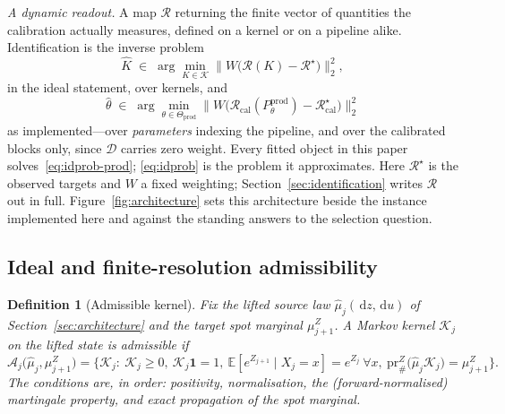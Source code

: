 \documentclass[11pt]{article}
\newtheorem{definition}{Definition}
\newcommand{\E}{\mathbb{E}}
\newcommand{\cK}{\mathcal{K}}
\newcommand{\cA}{\mathcal{A}}
\providecommand{\pr}{\mathrm{pr}}
\providecommand{\Kfam}{\mathcal{K}}
\providecommand{\Rcal}{\mathcal R}
\providecommand{\1}{\mathbf 1}
\newcommand{\dd}{\,\mathrm{d}}
\begin{document}
\emph{A dynamic readout.} A map $\Rcal$ returning the finite vector of quantities the calibration
actually measures, defined on a kernel or on a pipeline alike. Identification is the inverse
problem
\begin{equation}\label{eq:idprob}
  \widehat{K}\;\in\;\arg\min_{K\in\Kfam}
  \bigl\|W\bigl(\Rcal(K)-\Rcal^{\star}\bigr)\bigr\|_2^{2},
\end{equation}
in the ideal statement, over kernels, and
\begin{equation}\label{eq:idprob-prod}
  \widehat\theta\;\in\;\arg\min_{\theta\in\Theta_{\mathrm{prod}}}
  \bigl\|W\bigl(\Rcal_{\mathrm{cal}}(P^{\mathrm{prod}}_\theta)
      -\Rcal_{\mathrm{cal}}^{\star}\bigr)\bigr\|_2^{2}
\end{equation}
as implemented---over \emph{parameters} indexing the pipeline, and over the calibrated blocks only,
since $\mathcal D$ carries zero weight. Every fitted object in this paper
solves~\eqref{eq:idprob-prod}; \eqref{eq:idprob} is the problem it approximates. Here $\Rcal^{\star}$ is the observed targets and
$W$ a fixed weighting;
Section~\ref{sec:identification} writes $\Rcal$ out in full. Figure~\ref{fig:architecture}
sets this architecture beside the instance implemented here and against the standing
answers to the selection question.

\subsection{Ideal and finite-resolution admissibility}
\label{sec:admiss}
\begin{definition}[Admissible kernel]
Fix the lifted source law $\widehat\mu_j(\dd z,\dd u)$ of Section~\ref{sec:architecture} and the target spot marginal
$\mu^Z_{j+1}$. A Markov kernel $\cK_j$ on the lifted state is \emph{admissible} if
\begin{equation}
\cA_j\bigl(\widehat\mu_j,\mu^Z_{j+1}\bigr)=\Big\{\cK_j:\ \cK_j\ge 0,\ \cK_j\mathbf 1=1,\
\E[e^{Z_{j+1}}\mid X_j=x]=e^{Z_j}\ \forall x,\
\pr^Z_{\#}\bigl(\widehat\mu_j\cK_j\bigr)=\mu^Z_{j+1}\Big\}.
\label{eq:admissible}
\end{equation}
The conditions are, in order: positivity, normalisation, the (forward-normalised)
martingale property, and exact propagation of the \emph{spot} marginal.
\end{definition}
\end{document}
